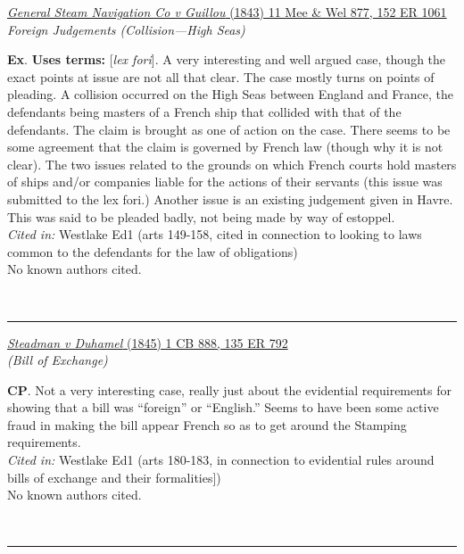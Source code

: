 \documentclass[twoside]{article}
\begin{document}
        \begin{small}
        \begin{center}
        \href{https://heinonline.org/HOL/P?h=hein.engrep/engrh0152&i=1065}{\textit{General Steam Navigation Co v Guillou} (1843) 11 Mee \& Wel 877, 152 ER 1061} \label{100} \\ 
\textit{Foreign Judgements (Collision---High Seas)}\\
        \end{center}
        \textbf{Ex}.  \textbf{Uses terms: }[\textit{lex fori}]. A very interesting and well argued case, though the exact points at issue are not all that clear. The case mostly turns on points of pleading. A collision occurred on the High Seas between England and France, the defendants being masters of a French ship that collided with that of the defendants. The claim is brought as one of action on the case. There seems to be some agreement that the claim is governed by French law (though why it is not clear). The two issues related to the grounds on which French courts hold masters of ships and/or companies liable for the actions of their servants (this issue was submitted to the lex fori.) Another issue is an existing judgement given in Havre. This was said to be pleaded badly, not being made by way of estoppel.\\\textit{Cited in: }Westlake Ed1 (arts 149-158, cited in connection to looking to laws common to the defendants for the law of obligations)\\No known authors cited.
        \end{small}\\
        \rule{\textwidth}{0.5pt}
        

        \begin{small}
        \begin{center}
        \href{https://heinonline.org/HOL/P?h=hein.engrep/engrg0135&i=796}{\textit{Steadman v Duhamel} (1845) 1 CB 888, 135 ER 792} \label{81} \\ 
\textit{ (Bill of Exchange)}\\
        \end{center}
        \textbf{CP}. Not a very interesting case, really just about the evidential requirements for showing that a bill was “foreign” or “English.” Seems to have been some active fraud in making the bill appear  French so as to get around the Stamping requirements.\\\textit{Cited in: }Westlake Ed1 (arts 180-183, in connection to evidential rules around bills of exchange and their formalities])\\No known authors cited.
        \end{small}\\
        \rule{\textwidth}{0.5pt}
        
\end{document}
